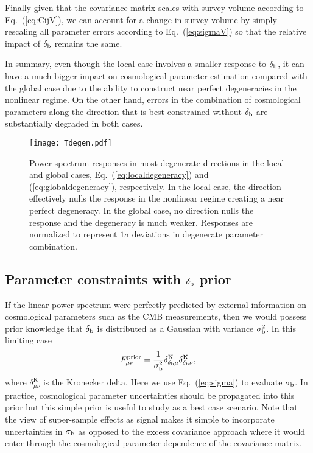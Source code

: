 \documentclass[prd,twocolumn,amsmath,amssymb,floatfix,superscriptaddress]{revtex4-1}
\newcommand{\br}{{\rm b}}
\begin{document}
{{Finally given that the covariance matrix scales with survey volume according
to Eq.~(\ref{eq:CijV}), we can account for a change in survey volume by
simply rescaling all parameter errors according to Eq.~(\ref{eq:sigmaV}) so that the
relative impact of $\delta_{\br}$ remains the same.



In summary, even though the local case involves a smaller response to $\delta_\br$,
it can have a much bigger impact on cosmological parameter estimation compared with the global
case  due to the ability to construct
near perfect degeneracies in the nonlinear regime.   On the other hand, errors in 
the combination of cosmological parameters along the direction that is best constrained without $\delta_\br$
are substantially degraded in both cases.
 



\begin{figure}[tb]
    \centering
    \texttt{[image: Tdegen.pdf]}
    \caption{
        \footnotesize Power spectrum responses in most degenerate directions in the
        local and global cases, Eq.~(\ref{eq:localdegeneracy}) and (\ref{eq:globaldegeneracy}), respectively.  In the local case, the direction effectively nulls the response in the
        nonlinear regime creating a near perfect degeneracy.  In the global case, no direction
        nulls the response and the degeneracy is much weaker.   Responses are normalized
        to represent $1\sigma$ deviations in degenerate parameter combination.
    }
    \label{fig:Tdegen}
\end{figure}



\subsection{Parameter constraints with $\delta_\br$ prior}
\label{sub:degen_prior}

If the linear power spectrum were perfectly predicted by external information on 
cosmological parameters {such as the CMB measurements,}
then we would possess prior knowledge that $\delta_\br$ is 
distributed as a Gaussian with variance $\sigma_\br^2$.  In this limiting case
\begin{equation}
    F_{\mu\nu}^{\rm prior} = \frac{1}{\sigma_\br^2}
    \delta^\mathrm{K}_{\delta_\br \mu}\delta^\mathrm{K}_{\delta_\br \nu},
\end{equation}
where $\delta^\mathrm{K}_{\mu\nu}$ is the Kronecker delta.
Here we use Eq.~(\ref{eq:sigma}) to evaluate
$\sigma_\br$.
In practice, cosmological parameter uncertainties should be propagated into this
prior but this simple prior is useful to study as a best case scenario.   Note that
the view of super-sample effects as signal makes it simple to incorporate uncertainties
in $\sigma_\br$ as opposed to the excess covariance approach where it would enter through
the cosmological parameter dependence of the covariance matrix.

}}
\end{document}
